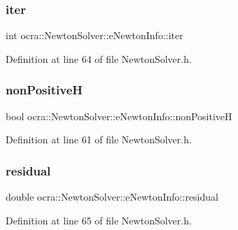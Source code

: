 \subsubsection{\texorpdfstring{iter}{iter}}
{\footnotesize\ttfamily int ocra\+::\+Newton\+Solver\+::e\+Newton\+Info\+::iter}



Definition at line 64 of file Newton\+Solver.\+h.

\hypertarget{structocra_1_1NewtonSolver_1_1eNewtonInfo_a088723d14881333ae7fcc9576c7142d0}{}\label{structocra_1_1NewtonSolver_1_1eNewtonInfo_a088723d14881333ae7fcc9576c7142d0} 
\subsubsection{\texorpdfstring{non\+PositiveH}{nonPositiveH}}
{\footnotesize\ttfamily bool ocra\+::\+Newton\+Solver\+::e\+Newton\+Info\+::non\+PositiveH}



Definition at line 61 of file Newton\+Solver.\+h.

\hypertarget{structocra_1_1NewtonSolver_1_1eNewtonInfo_a5b0d53fdf4347e5bc6f4d1af784eb517}{}\label{structocra_1_1NewtonSolver_1_1eNewtonInfo_a5b0d53fdf4347e5bc6f4d1af784eb517} 
\subsubsection{\texorpdfstring{residual}{residual}}
{\footnotesize\ttfamily double ocra\+::\+Newton\+Solver\+::e\+Newton\+Info\+::residual}



Definition at line 65 of file Newton\+Solver.\+h.

\hypertarget{structocra_1_1NewtonSolver_1_1eNewtonInfo_a034b326acca364d57a7bdeea79849625}{}\label{structocra_1_1NewtonSolver_1_1eNewtonInfo_a034b326acca364d57a7bdeea79849625} 
